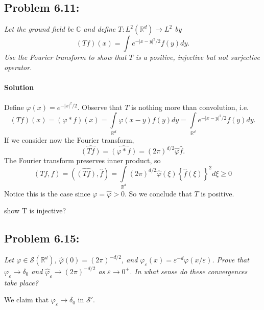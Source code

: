\documentclass[letterpaper,twoside,11pt]{article}
\theoremstyle{mystyle}
\newcommand{\R}{{\mathbb R}}
\newcommand{\cbk}{\color{black}}
\newcommand{\cred}{\color{red}}
\begin{document}
\newpage
\subsection*{Problem 6.11:}
\textit{Let the ground field be $\mathbb C$ and define $T: L^2\left( \R^d  \right) \to L^2$ by }
\[\left( Tf \right)(x) = \int e^{-|x-y|^2/2} f(y) dy.\]
\textit{Use the Fourier transform to show that $T$ is a positive, injective but not surjective operator. }
\paragraph*{Solution} 
Define $\varphi(x) = e^{-|x|^2/2}$. Observe that $T$ is nothing more than convolution, i.e. 
\[\left( {Tf} \right)\left( x \right) = \left( {\varphi  * f} \right)\left( x \right) = \int\limits_{{\mathbb{R}^d}} {\varphi \left( {x - y} \right)f\left( y \right)dy}  = \int\limits_{{\mathbb{R}^d}} {{e^{ - {{\left| {x - y} \right|}^2}/2}}f\left( y \right)dy} .\]
If we consider now the Fourier transform,
\[\widehat {\left( {Tf} \right)} = \widehat {\left( {\varphi  * f} \right)} = {\left( {2\pi } \right)^{d/2}}\hat \varphi \hat f.\]
The Fourier transform preserves inner product, so 
\[\left( {Tf,f} \right) = \left( {\widehat {\left( {Tf} \right)},\hat f} \right) = \int\limits_{{\mathbb{R}^d}} {{{\left( {2\pi } \right)}^{d/2}}\hat \varphi \left( \xi  \right){{\left\{ {\hat f\left( \xi  \right)} \right\}}^2}d\xi }  \geqslant 0\]
Notice this is the case since $\varphi = \hat \varphi >0$. So we conclude that $T$ is positive. 

\cred show T is injective?
\cbk 
















\newpage 
\subsection*{Problem 6.15:}
\textit{Let $\varphi \in \mathcal S \left( \R^d \right)$, $\hat \varphi \left( 0 \right) = \left( 2\pi \right)^{-d/2}$, and $\varphi_\varepsilon \left( x \right) = \varepsilon^{-d} \varphi\left( x/\varepsilon \right)$. Prove that $\varphi_\varepsilon \to \delta_0$ and $\hat \varphi_\varepsilon \to \left( 2\pi  \right)^{-d/2}$ as $\varepsilon \to 0^+$. In what sense do these convergences take place? }

We claim that $\varphi_\varepsilon \to \delta_0$ in $\mathcal S'$. 
\end{document}
